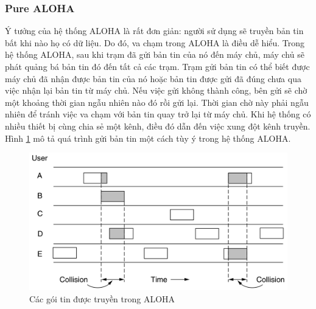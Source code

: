\subsubsection{Pure ALOHA}
Ý tưởng của hệ thống ALOHA là rất đơn giản: người sử dụng sẽ truyền bản tin bất khi nào họ có dữ liệu. Do đó, va chạm trong ALOHA là điều dễ hiểu. Trong hệ thống ALOHA, sau khi trạm đã gửi bản tin của nó đến máy chủ, máy chủ sẽ phát quảng bá bản tin đó đến tất cả các trạm. Trạm gửi bản tin có thể biết được máy chủ đã nhận được bản tin của nó hoặc bản tin được gửi đã đúng chưa qua việc nhận lại bản tin từ máy chủ. Nếu việc gửi không thành công, bên gửi sẽ chờ một khoảng thời gian ngẫu nhiên nào đó rồi gửi lại. Thời gian chờ này phải ngẫu nhiên để tránh việc va chạm với bản tin quay trở lại từ máy chủ. Khi hệ thống có nhiều thiết bị cùng chia sẻ một kênh, điều đó dẫn đến việc xung đột kênh truyền. Hình \ref{aloha_conflict} mô tả quá trình gửi bản tin một cách tùy ý trong hệ thống ALOHA.\\
\begin{figure}[htp]
\begin{center}
\includegraphics[scale=0.26]{image/aloha_conflict}
\end{center}
\caption{Các gói tin được truyền trong ALOHA \cite{6}}
\label{aloha_conflict}
\end{figure}
